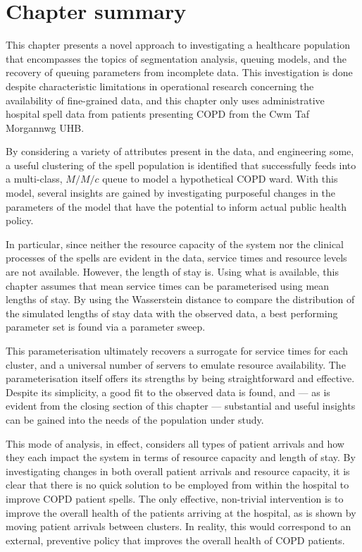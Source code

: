 \section{Chapter summary}\label{sec:copd:summary}

This chapter presents a novel approach to investigating a healthcare population
that encompasses the topics of segmentation analysis, queuing models, and the
recovery of queuing parameters from incomplete data. This investigation is done
despite characteristic limitations in operational research concerning the
availability of fine-grained data, and this chapter only uses administrative
hospital spell data from patients presenting COPD from the Cwm Taf Morgannwg
UHB.\

By considering a variety of attributes present in the data, and engineering
some, a useful clustering of the spell population is identified that
successfully feeds into a multi-class, \(M/M/c\) queue to model a hypothetical
COPD ward. With this model, several insights are gained by investigating
purposeful changes in the parameters of the model that have the potential to
inform actual public health policy.

In particular, since neither the resource capacity of the system nor the
clinical processes of the spells are evident in the data, service times and
resource levels are not available. However, the length of stay is. Using what is
available, this chapter assumes that mean service times can be parameterised
using mean lengths of stay. By using the Wasserstein distance to compare the
distribution of the simulated lengths of stay data with the observed data, a
best performing parameter set is found via a parameter sweep.

This parameterisation ultimately recovers a surrogate for service times for each
cluster, and a universal number of servers to emulate resource availability. The
parameterisation itself offers its strengths by being straightforward and
effective. Despite its simplicity, a good fit to the observed data is found,
and --- as is evident from the closing section of this chapter --- substantial
and useful insights can be gained into the needs of the population under study.

This mode of analysis, in effect, considers all types of patient arrivals and
how they each impact the system in terms of resource capacity and length of
stay. By investigating changes in both overall patient arrivals and resource
capacity, it is clear that there is no quick solution to be employed from within
the hospital to improve COPD patient spells. The only effective, non-trivial
intervention is to improve the overall health of the patients arriving at the
hospital, as is shown by moving patient arrivals between clusters. In reality,
this would correspond to an external, preventive policy that improves the
overall health of COPD patients.

